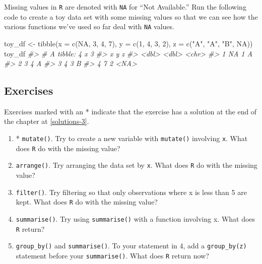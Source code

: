 \documentclass[
]{book}
\newenvironment{Shaded}{\begin{snugshade}}{\end{snugshade}}
\newcommand{\AttributeTok}[1]{\textcolor[rgb]{0.77,0.63,0.00}{#1}}
\newcommand{\CommentTok}[1]{\textcolor[rgb]{0.56,0.35,0.01}{\textit{#1}}}
\newcommand{\ConstantTok}[1]{\textcolor[rgb]{0.00,0.00,0.00}{#1}}
\newcommand{\DecValTok}[1]{\textcolor[rgb]{0.00,0.00,0.81}{#1}}
\newcommand{\FunctionTok}[1]{\textcolor[rgb]{0.00,0.00,0.00}{#1}}
\newcommand{\NormalTok}[1]{#1}
\newcommand{\OtherTok}[1]{\textcolor[rgb]{0.56,0.35,0.01}{#1}}
\newcommand{\StringTok}[1]{\textcolor[rgb]{0.31,0.60,0.02}{#1}}
\begin{document}
Missing values in \texttt{R} are denoted with \texttt{NA} for ``Not Available.'' Run the following code to create a toy data set with some missing values so that we can see how the various functions we've used so far deal with \texttt{NA} values.

\begin{Shaded}
\begin{Highlighting}[]
\NormalTok{toy\_df }\OtherTok{\textless{}{-}} \FunctionTok{tibble}\NormalTok{(}\AttributeTok{x =} \FunctionTok{c}\NormalTok{(}\ConstantTok{NA}\NormalTok{, }\DecValTok{3}\NormalTok{, }\DecValTok{4}\NormalTok{, }\DecValTok{7}\NormalTok{),}
                 \AttributeTok{y =} \FunctionTok{c}\NormalTok{(}\DecValTok{1}\NormalTok{, }\DecValTok{4}\NormalTok{, }\DecValTok{3}\NormalTok{, }\DecValTok{2}\NormalTok{),}
                 \AttributeTok{z =} \FunctionTok{c}\NormalTok{(}\StringTok{"A"}\NormalTok{, }\StringTok{"A"}\NormalTok{, }\StringTok{"B"}\NormalTok{, }\ConstantTok{NA}\NormalTok{))}
\NormalTok{toy\_df}
\CommentTok{\#\textgreater{} \# A tibble: 4 x 3}
\CommentTok{\#\textgreater{}       x     y z    }
\CommentTok{\#\textgreater{}   \textless{}dbl\textgreater{} \textless{}dbl\textgreater{} \textless{}chr\textgreater{}}
\CommentTok{\#\textgreater{} 1    NA     1 A    }
\CommentTok{\#\textgreater{} 2     3     4 A    }
\CommentTok{\#\textgreater{} 3     4     3 B    }
\CommentTok{\#\textgreater{} 4     7     2 \textless{}NA\textgreater{}}
\end{Highlighting}
\end{Shaded}

\hypertarget{exercise-3-4}{%
\subsection{Exercises}\label{exercise-3-4}}

Exercises marked with an * indicate that the exercise has a solution at the end of the chapter at \ref{solutions-3}.

\begin{enumerate}
\def\labelenumi{\arabic{enumi}.}
\item
  * \texttt{mutate()}. Try to create a new variable with \texttt{mutate()} involving \texttt{x}. What does \texttt{R} do with the missing value?
\item
  \texttt{arrange()}. Try arranging the data set by \texttt{x}. What does \texttt{R} do with the missing value?
\item
  \texttt{filter()}. Try filtering so that only observations where x is less than 5 are kept. What does \texttt{R} do with the missing value?
\item
  \texttt{summarise()}. Try using \texttt{summarise()} with a function involving x. What does \texttt{R} return?
\item
  \texttt{group\_by()} and \texttt{summarise()}. To your statement in 4, add a \texttt{group\_by(z)} statement before your \texttt{summarise()}. What does \texttt{R} return now?
\end{enumerate}
\end{document}
